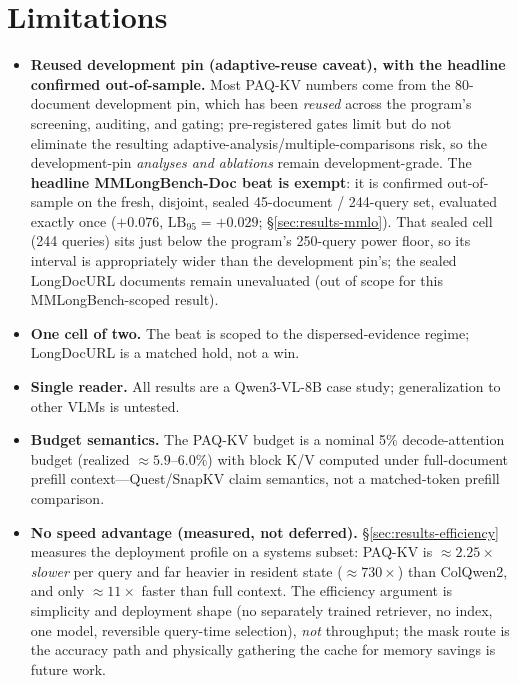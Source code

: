\documentclass[letterpaper]{article} %
\newcommand{\paqc}{\textsc{PAQ-KV}}
\newcommand{\lb}{\mathrm{LB}_{95}}
\begin{document}
\section{Limitations}\label{sec:limitations}
\begin{itemize}
\item \textbf{Reused development pin (adaptive-reuse caveat), with the headline confirmed out-of-sample.} Most \paqc{} numbers come from the 80-document development pin, which has been \emph{reused} across the program's screening, auditing, and gating; pre-registered gates limit but do not eliminate the resulting adaptive-analysis/multiple-comparisons risk, so the development-pin \emph{analyses and ablations} remain development-grade. The \textbf{headline MMLongBench-Doc beat is exempt}: it is confirmed out-of-sample on the fresh, disjoint, sealed 45-document / 244-query set, evaluated exactly once ($+0.076$, $\lb=+0.029$; \S\ref{sec:results-mmlo}). That sealed cell (244 queries) sits just below the program's 250-query power floor, so its interval is appropriately wider than the development pin's; the sealed LongDocURL documents remain unevaluated (out of scope for this MMLongBench-scoped result).
\item \textbf{One cell of two.} The beat is scoped to the dispersed-evidence regime; LongDocURL is a matched hold, not a win.
\item \textbf{Single reader.} All results are a Qwen3-VL-8B case study; generalization to other VLMs is untested.
\item \textbf{Budget semantics.} The \paqc{} budget is a nominal 5\% decode-attention budget (realized ${\approx}5.9$--$6.0\%$) with block K/V computed under full-document prefill context---Quest/SnapKV claim semantics, not a matched-token prefill comparison.
\item \textbf{No speed advantage (measured, not deferred).} \S\ref{sec:results-efficiency} measures the deployment profile on a systems subset: \paqc{} is ${\approx}2.25\times$ \emph{slower} per query and far heavier in resident state (${\approx}730\times$) than ColQwen2, and only ${\approx}11\times$ faster than full context. The efficiency argument is simplicity and deployment shape (no separately trained retriever, no index, one model, reversible query-time selection), \emph{not} throughput; the mask route is the accuracy path and physically gathering the cache for memory savings is future work.
\end{itemize}
\end{document}
